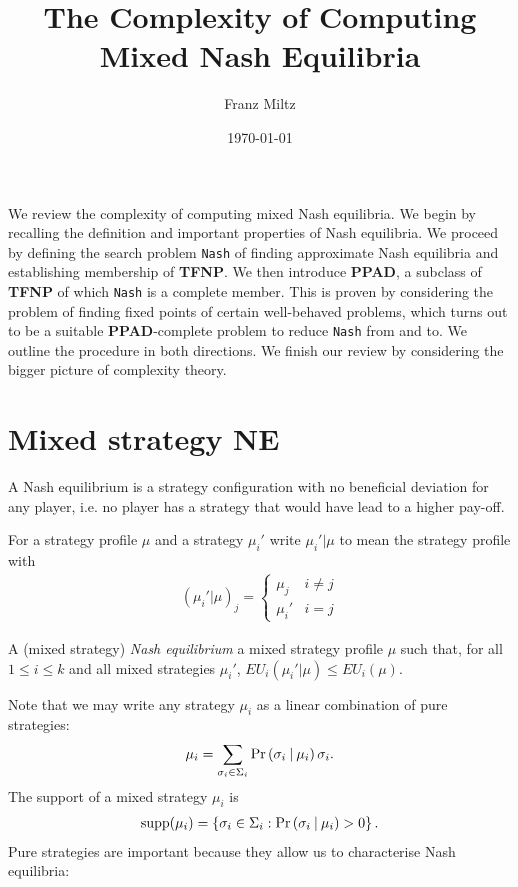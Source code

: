 \documentclass{article}
\begin{document}
\title{The Complexity of Computing Mixed Nash Equilibria}
\author{Franz Miltz}
\date{\today}
\maketitle

We review the complexity of computing mixed Nash equilibria. We begin by
recalling the definition and important properties of Nash equilibria. We
proceed by defining the search problem \texttt{Nash} of finding approximate
Nash equilibria and establishing membership of \textbf{TFNP}. We then introduce
\textbf{PPAD}, a subclass of \textbf{TFNP} of which \texttt{Nash} is a complete
member. This is proven by considering the problem of finding fixed points of
certain well-behaved problems, which turns out to be a suitable
\textbf{PPAD}-complete problem to reduce \texttt{Nash} from and to. We outline
the procedure in both directions.
We finish our review by considering the bigger picture of complexity
theory.

\section{Mixed strategy NE}

A Nash equilibrium is a strategy configuration with no beneficial
deviation for any player, i.e. no player has a strategy that would have
lead to a higher pay-off.

For a strategy profile $\mu$ and a strategy $\mu_i'$ write
$\mu_i' | \mu$ to mean the strategy profile with
\begin{align*}
  (\mu_i' | \mu)_j = \begin{cases}
    \mu_j & i\neq j \\
    \mu_i' & i = j
  \end{cases}
\end{align*}

\begin{definition}
  A (mixed strategy) \emph{Nash equilibrium} a mixed strategy profile $\mu$
  such that, for all $1\leq i\leq k$ and all mixed strategies $\mu_i'$,
  $EU_i(\mu_i' | \mu) \leq EU_i(\mu)$.
\end{definition}

Note that we may write any strategy $\mu_i$ as a linear
combination of pure strategies:
\begin{align*}
  \mu_i = \sum_{\sigma_i\in\Sigma_i} \Pr\left({{\sigma_i}\:|\:\mu_i}\right) \sigma_i.
\end{align*}
The support of a mixed strategy $\mu_i$ is
\begin{align*}
  \operatorname*{supp}(\mu_i) = \left\lbrace{\sigma_i \in \Sigma_i : \Pr\left({{\sigma_i}\:|\:\mu_i}\right) > 0}\right\rbrace.
\end{align*}
Pure strategies are important because they allow us to characterise
Nash equilibria:
\end{document}
